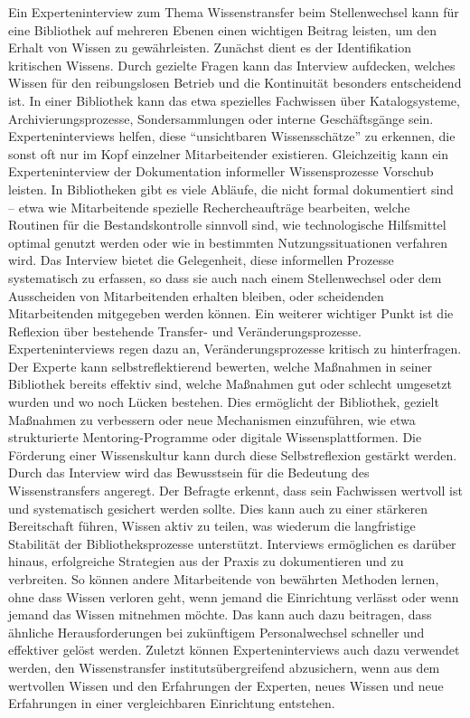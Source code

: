 \documentclass[a4paper,
fontsize=11pt,
oneside,
numbers=noperiodatend,
parskip=half-,
bibliography=totoc,
final
]{scrartcl}
\begin{document}
Ein Experteninterview zum Thema Wissenstransfer beim Stellenwechsel kann
für eine Bibliothek auf mehreren Ebenen einen wichtigen Beitrag leisten,
um den Erhalt von Wissen zu gewährleisten. Zunächst dient es der
Identifikation kritischen Wissens. Durch gezielte Fragen kann das
Interview aufdecken, welches Wissen für den reibungslosen Betrieb und
die Kontinuität besonders entscheidend ist. In einer Bibliothek kann das
etwa spezielles Fachwissen über Katalogsysteme, Archivierungsprozesse,
Sondersammlungen oder interne Geschäftsgänge sein. Experteninterviews
helfen, diese \enquote{unsichtbaren Wissensschätze} zu erkennen, die
sonst oft nur im Kopf einzelner Mitarbeitender existieren. Gleichzeitig
kann ein Experteninterview der Dokumentation informeller Wissensprozesse
Vorschub leisten. In Bibliotheken gibt es viele Abläufe, die nicht
formal dokumentiert sind -- etwa wie Mitarbeitende spezielle
Rechercheaufträge bearbeiten, welche Routinen für die Bestandskontrolle
sinnvoll sind, wie technologische Hilfsmittel optimal genutzt werden
oder wie in bestimmten Nutzungssituationen verfahren wird. Das Interview
bietet die Gelegenheit, diese informellen Prozesse systematisch zu
erfassen, so dass sie auch nach einem Stellenwechsel oder dem
Ausscheiden von Mitarbeitenden erhalten bleiben, oder scheidenden
Mitarbeitenden mitgegeben werden können. Ein weiterer wichtiger Punkt
ist die Reflexion über bestehende Transfer- und Veränderungsprozesse.
Experteninterviews regen dazu an, Veränderungsprozesse kritisch zu
hinterfragen. Der Experte kann selbstreflektierend bewerten, welche
Maßnahmen in seiner Bibliothek bereits effektiv sind, welche Maßnahmen
gut oder schlecht umgesetzt wurden und wo noch Lücken bestehen. Dies
ermöglicht der Bibliothek, gezielt Maßnahmen zu verbessern oder neue
Mechanismen einzuführen, wie etwa strukturierte Mentoring-Programme oder
digitale Wissensplattformen. Die Förderung einer Wissenskultur kann
durch diese Selbstreflexion gestärkt werden. Durch das Interview wird
das Bewusstsein für die Bedeutung des Wissenstransfers angeregt. Der
Befragte erkennt, dass sein Fachwissen wertvoll ist und systematisch
gesichert werden sollte. Dies kann auch zu einer stärkeren Bereitschaft
führen, Wissen aktiv zu teilen, was wiederum die langfristige Stabilität
der Bibliotheksprozesse unterstützt. Interviews ermöglichen es darüber
hinaus, erfolgreiche Strategien aus der Praxis zu dokumentieren und zu
verbreiten. So können andere Mitarbeitende von bewährten Methoden
lernen, ohne dass Wissen verloren geht, wenn jemand die Einrichtung
verlässt oder wenn jemand das Wissen mitnehmen möchte. Das kann auch
dazu beitragen, dass ähnliche Herausforderungen bei zukünftigem
Personalwechsel schneller und effektiver gelöst werden. Zuletzt können
Experteninterviews auch dazu verwendet werden, den Wissenstransfer
institutsübergreifend abzusichern, wenn aus dem wertvollen Wissen und
den Erfahrungen der Experten, neues Wissen und neue Erfahrungen in einer
vergleichbaren Einrichtung entstehen.
\end{document}
